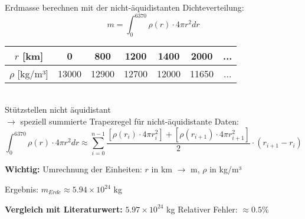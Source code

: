 \begin{example2}{Erdmasse berechnen} 
mit der nicht-äquidistanten Dichteverteilung:
\vspace{-3mm}\\
$$m = \int_0^{6370} \rho(r) \cdot 4\pi r^2 dr$$

\begin{tabular}{|c|c|c|c|c|c|c|}
\hline
$r$ [km] & 0 & 800 & 1200 & 1400 & 2000 & ... \\
\hline
$\rho$ [kg/m³] & 13000 & 12900 & 12700 & 12000 & 11650 & ... \\
\hline
\end{tabular}
\vspace{1mm}\\
Stützstellen nicht äquidistant \\ $\rightarrow$ speziell summierte Trapezregel für nicht-äquidistante Daten:
$$\int_0^{6370} \rho(r) \cdot 4\pi r^2 dr \approx \sum_{i=0}^{n-1} \frac{[\rho(r_i) \cdot 4\pi r_i^2] + [\rho(r_{i+1}) \cdot 4\pi r_{i+1}^2]}{2} \cdot (r_{i+1} - r_i)$$

\textbf{Wichtig:} Umrechnung der Einheiten: $r$ in km $\rightarrow$ m, $\rho$ in kg/m³

Ergebnis: $m_{Erde} \approx 5.94 \times 10^{24}$ kg

\textbf{Vergleich mit Literaturwert:} $5.97 \times 10^{24}$ kg
Relativer Fehler: $\approx 0.5\%$
\end{example2}


